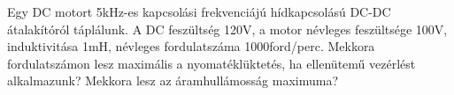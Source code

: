 \begin{example}

Egy DC motort 5kHz-es kapcsolási frekvenciájú hídkapcsolású DC-DC átalakítóról táplálunk. A DC feszültség 120V, a motor névleges feszültsége 100V, induktivitása 1mH, névleges fordulatszáma 1000ford/perc. Mekkora fordulatszámon lesz maximális a nyomatéklüktetés, ha ellenütemű vezérlést alkalmazunk? Mekkora lesz az áramhullámosság maximuma?

\tcbline
\vspace{1mm}

\solution

\end{example}